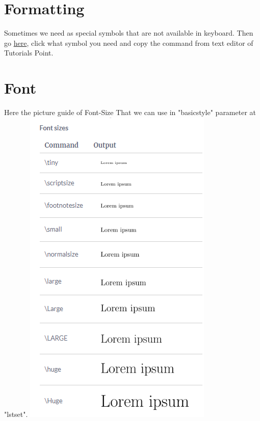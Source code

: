 \documentclass[11 pt]{book}
\begin{document}
\section{Formatting}
Sometimes we need as special symbols that are not available in keyboard. Then go \href{https://www.tutorialspoint.com/online_latex_editor.php}{{\color{blue}here}}, click what symbol you need and copy the command from text editor of {\color{red}Tutorials Point}.

\section{Font}
Here the picture guide of Font-Size That we can use in "basicstyle" parameter at "lstset".
\includegraphics[scale=1]{../Font size.png} 
\end{document}

